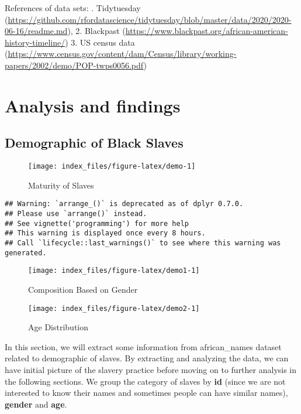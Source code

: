 \documentclass[
]{article}
\begin{document}
References of data sets:
. Tidytuesday (\url{https://github.com/rfordatascience/tidytuesday/blob/master/data/2020/2020-06-16/readme.md}),
2. Blackpast (\url{https://www.blackpast.org/african-american-history-timeline/})
3. US census data (\url{https://www.census.gov/content/dam/Census/library/working-papers/2002/demo/POP-twps0056.pdf})

\hypertarget{analysis-and-findings}{%
\section{Analysis and findings}\label{analysis-and-findings}}

\hypertarget{demographic-of-black-slaves}{%
\subsection{Demographic of Black Slaves}\label{demographic-of-black-slaves}}

\begin{figure}

{\centering \texttt{[image: index\_files/figure-latex/demo-1]} 

}

\caption{Maturity of Slaves}\label{fig:demo}
\end{figure}

\begin{verbatim}
## Warning: `arrange_()` is deprecated as of dplyr 0.7.0.
## Please use `arrange()` instead.
## See vignette('programming') for more help
## This warning is displayed once every 8 hours.
## Call `lifecycle::last_warnings()` to see where this warning was generated.
\end{verbatim}

\begin{figure}
\texttt{[image: index\_files/figure-latex/demo1-1]} \caption{Composition Based on Gender}\label{fig:demo1}
\end{figure}

\begin{figure}
\texttt{[image: index\_files/figure-latex/demo2-1]} \caption{Age Distribution}\label{fig:demo2}
\end{figure}

In this section, we will extract some information from african\_names dataset related to demographic of slaves. By extracting and analyzing the data, we can have initial picture of the slavery practice before moving on to further analysis in the following sections. We group the category of slaves by \textbf{id} (since we are not interested to know their names and sometimes people can have similar names), \textbf{gender} and \textbf{age}.
\end{document}
